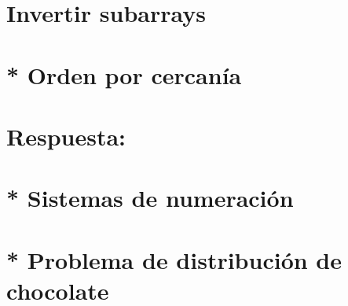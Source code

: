 \section{Invertir subarrays}


\section{* Orden por cercanía}

\ifshowanswers
\section*{Respuesta:}

\fi

\section{* Sistemas de numeración}


\section{* Problema de distribución de chocolate}

